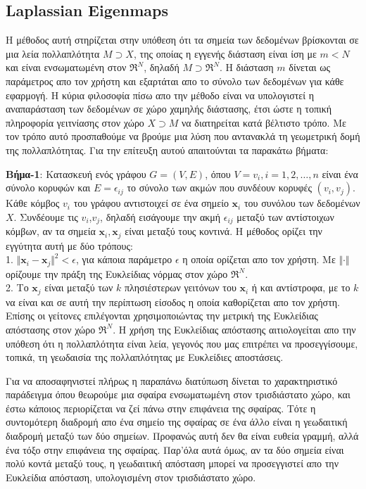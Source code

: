 \subsection{\textlatin{Laplassian Eigenmaps}}
\par
Η μέθοδος αυτή \textlatin{\cite{laplassianeigenmaps}} στηρίζεται στην υπόθεση ότι τα σημεία των δεδομένων βρίσκονται σε μια λεία πολλαπλότητα $ Μ \supset Χ $, της οποίας η εγγενής διάσταση είναι ίση με $m<N$ και είναι ενσωματωμένη στον $ \Re^{N} $, δηλαδή $ Μ \supset \Re^{N} $. Η διάσταση $m$ δίνεται ως παράμετρος απο τον χρήστη και εξαρτάται απο το σύνολο των δεδομένων για κάθε εφαρμογή. Η κύρια φιλοσοφία πίσω απο την μέθοδο είναι να υπολογιστεί η αναπαράσταση των δεδομένων σε χώρο χαμηλής διάστασης, έτσι ώστε η τοπική πληροφορία γειτνίασης στον χώρο $Χ \supset M$ να διατηρείται κατά βέλτιστο τρόπο. Με τον τρόπο αυτό προσπαθούμε να βρούμε μια λύση που αντανακλά τη γεωμετρική δομή της πολλαπλότητας. Για την επίτευξη αυτού απαιτούνται τα παρακάτω βήματα:
\par
\textbf{Βήμα-1}: Κατασκευή ενός γράφου $G=(V,E)$, όπου $V={v_{i},i=1,2,\ldots,n}$ είναι ένα σύνολο κορυφών και $E={\epsilon_{ij}}$ το σύνολο των ακμών που συνδέουν κορυφές $(v_{i},v_{j})$. Κάθε κόμβος $v_{i}$ του γράφου αντιστοιχεί σε ένα σημείο $\mathbf{x}_{i}$ του συνόλου των δεδομένων $X$. Συνδέουμε τις $v_{i}$,$v_{j}$, δηλαδή εισάγουμε την ακμή $\epsilon_{ij}$ μεταξύ των αντίστοιχων κόμβων, αν τα σημεία $\mathbf{x}_{i},\mathbf{x}_{j}$ είναι μεταξύ τους κοντινά. Η μέθοδος ορίζει την εγγύτητα αυτή με δύο τρόπους: \\
1. $\Vert \mathbf{x}_{i}-\mathbf{x}_{j} \Vert ^{2} < \epsilon $, για κάποια παράμετρο $\epsilon$ η οποία ορίζεται απο τον χρήστη. Με $\Vert\cdot\Vert$ ορίζουμε την πράξη της Ευκλείδιας νόρμας στον χώρο $\Re^{N}$. \\
2. Το $\mathbf{x}_{j}$ είναι μεταξύ των $k$ πλησιέστερων γειτόνων του $\mathbf{x}_{i}$ ή και αντίστροφα, με το $k$ να είναι και σε αυτή την περίπτωση είσοδος η οποία καθορίζεται απο τον χρήστη. Επίσης οι γείτονες επιλέγονται χρησιμοποιώντας την μετρική της Ευκλείδιας απόστασης στον χώρο $\Re^{N}$. Η χρήση της Ευκλείδιας απόστασης αιτιολογείται απο την υπόθεση ότι η πολλαπλότητα είναι λεία, γεγονός που μας επιτρέπει να προσεγγίσουμε, τοπικά, τη γεωδαισία της πολλαπλότητας με Ευκλείδιες αποστάσεις.
\par
Για να αποσαφηνιστεί πλήρως η παραπάνω διατύπωση δίνεται το χαρακτηριστικό παράδειγμα όπου θεωρούμε μια σφαίρα ενσωματωμένη στον τρισδιάστατο χώρο, και έστω κάποιος περιορίζεται να ζεί πάνω στην επιφάνεια της σφαίρας. Τότε η συντομότερη διαδρομή απο ένα σημείο της σφαίρας σε ένα άλλο είναι η γεωδαιτική διαδρομή μεταξύ των δύο σημείων. Προφανώς αυτή δεν θα είναι ευθεία γραμμή, αλλά ένα τόξο στην επιφάνεια της σφαίρας. Παρ'όλα αυτά όμως, αν τα δύο σημεία είναι πολύ κοντά μεταξύ τους, η γεωδαιτική απόσταση μπορεί να προσεγγιστεί απο την Ευκλείδια απόσταση, υπολογισμένη στον τρισδιάστατο χώρο.
